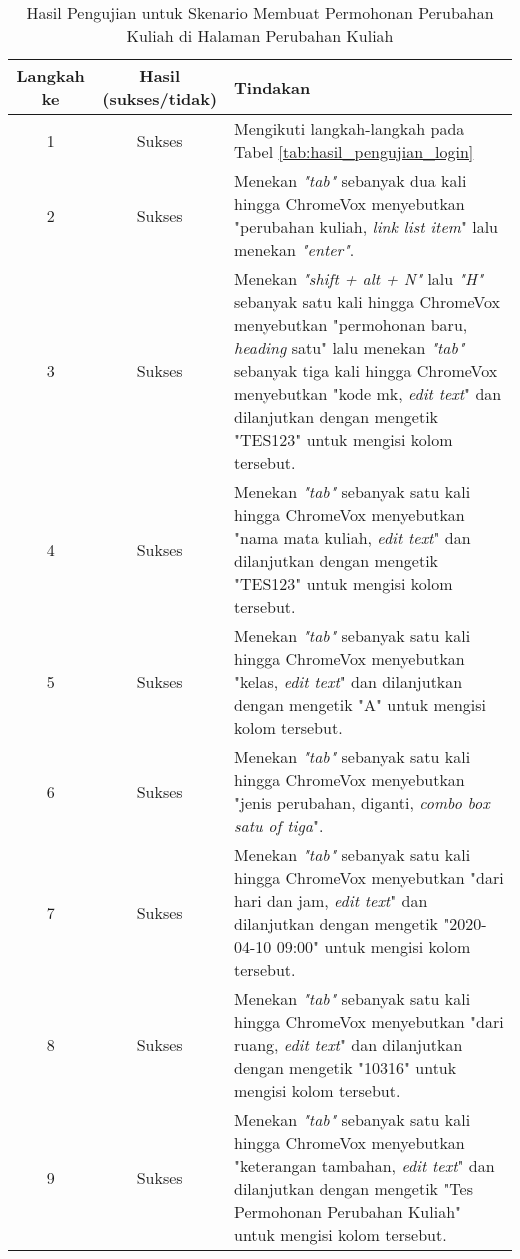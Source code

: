 \begin{table}[H]
    \centering 
    \caption{Hasil Pengujian untuk Skenario Membuat Permohonan Perubahan Kuliah di Halaman Perubahan Kuliah}
    \label{tab:hasil_pengujian_membuat_permohonan_perubahan_kuliah_di_halaman_perubahan_kuliah}
    \begin{tabular}{|c|c|p{10cm}|}
        \toprule
        Langkah ke & Hasil (sukses/tidak) & Tindakan \\

        \midrule
        1 & Sukses & Mengikuti langkah-langkah pada Tabel \ref{tab:hasil_pengujian_login} \\
        2 & Sukses & Menekan \textit{"tab"} sebanyak dua kali hingga ChromeVox menyebutkan "perubahan kuliah, \textit{link list item}" lalu menekan \textit{"enter"}. \\
        3 & Sukses & Menekan \textit{"shift + alt + N"} lalu \textit{"H"} sebanyak satu kali hingga ChromeVox menyebutkan "permohonan baru, \textit{heading} satu" lalu menekan \textit{"tab"} sebanyak tiga kali hingga ChromeVox menyebutkan "kode mk, \textit{edit text}" dan dilanjutkan dengan mengetik "TES123" untuk mengisi kolom tersebut. \\
        4 & Sukses & Menekan \textit{"tab"} sebanyak satu kali hingga ChromeVox menyebutkan "nama mata kuliah, \textit{edit text}" dan dilanjutkan dengan mengetik "TES123" untuk mengisi kolom tersebut. \\
        5 & Sukses & Menekan \textit{"tab"} sebanyak satu kali hingga ChromeVox menyebutkan "kelas, \textit{edit text}" dan dilanjutkan dengan mengetik "A" untuk mengisi kolom tersebut. \\
        6 & Sukses & Menekan \textit{"tab"} sebanyak satu kali hingga ChromeVox menyebutkan "jenis perubahan, diganti, \textit{combo box satu of tiga}". \\
        7 & Sukses & Menekan \textit{"tab"} sebanyak satu kali hingga ChromeVox menyebutkan "dari hari dan jam, \textit{edit text}" dan dilanjutkan dengan mengetik "2020-04-10 09:00" untuk mengisi kolom tersebut. \\
        8 & Sukses & Menekan \textit{"tab"} sebanyak satu kali hingga ChromeVox menyebutkan "dari ruang, \textit{edit text}" dan dilanjutkan dengan mengetik "10316" untuk mengisi kolom tersebut. \\
        9 & Sukses & Menekan \textit{"tab"} sebanyak satu kali hingga ChromeVox menyebutkan "keterangan tambahan, \textit{edit text}" dan dilanjutkan dengan mengetik "Tes Permohonan Perubahan Kuliah" untuk mengisi kolom tersebut. \\

\end{tabular}
\end{table}
